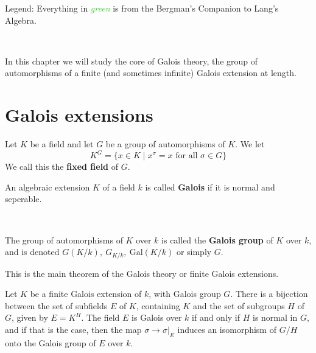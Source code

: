 
\usepackage{thmtools}
\usepackage{makeidx}
\makeindex


\newcommand{\Gal}{\text{Gal}}
\newcommand{\Bergman}[1]{\textcolor{LimeGreen}{\textit{#1}}}

Legend: Everything in \Bergman{green} is from the Bergman's Companion to Lang's Algebra.

\

In this chapter we will study the core of Galois theory, the group of automorphisms of a finite (and sometimes infinite) Galois extension at length.
    \section{Galois extensions}
\begin{definition}
    Let $K$ be a field and let $G$ be a group of automorphisms of $K$. We let \[K^G = \{x\in K\mid x^\sigma = x \text{ for all }\sigma \in G\}\]We call this the \textbf{fixed field} of $G$. 
\end{definition}

\begin{definition}
    An algebraic extension $K$ of a field $k$ is called \textbf{Galois} if it is normal and seperable.

    \

    The group of automorphisms of $K$ over $k$ is called the \textbf{Galois group} of $K$ over $k$, and is denoted $G(K/k), \ G_{K/k}, \ \Gal(K/k)$ or simply $G$.
\end{definition}

This is the main theorem of the Galois theory or finite Galois extensions.
\begin{theorem}\label{main}
    Let $K$ be a finite Galois extension of $k$, with Galois group $G$. There is a bijection between the set of subfields $E$ of $K$, containing $K$ and the set of subgroups $H$ of $G$, given by $E=K^H$. The field $E$ is Galois over $k$ if and only if $H$ is normal in $G$, and if that is the case, then the map $\sigma\rightarrow \sigma|_E$ induces an isomorphism
    of $G/H$ onto the Galois group of $E$ over $k$.
\end{theorem}

